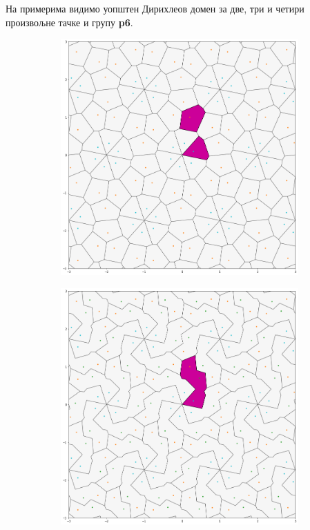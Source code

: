 \documentclass[12pt]{report}
\begin{document}


\begin{samepage}
На примерима видимо уопштен Дирихлеов домен за две, три и четири произвољне тачке и групу \textbf{p6}.

\begin{figure}[H]
  \begin{subfigure}[b]{0.32\textwidth}
    \includegraphics[width=.9\textwidth]{visetacaka1.png}
    \label{fig:f4}
  \end{subfigure}
  \begin{subfigure}[b]{0.32\textwidth}
    \includegraphics[width=.9\textwidth]{visetacaka2.png}

\end{subfigure}
\end{figure}
\end{samepage}
\end{document}
